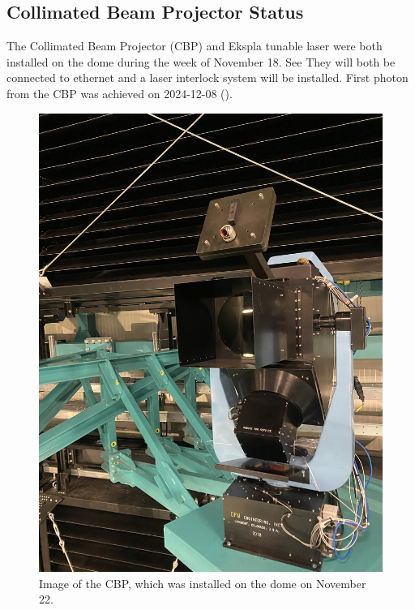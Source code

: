 \subsection{Collimated Beam Projector Status}
\label{sec:cbp}

The Collimated Beam Projector (CBP) and Ekspla tunable laser were both installed on the dome during the week
of November 18. See  They will both be connected to ethernet and a laser interlock system will
be installed. First photon from the CBP was achieved on 2024-12-08 ().

  
\begin{figure}[htbp]
  \begin{center}
    \includegraphics[height=0.5\textheight]{throughput_for_focused_light_figures/cbp_on_dome_2}
  \end{center}
  \caption{Image of the CBP, which was installed on the dome on November 22.}
  \label{fig:cbp_2}
\end{figure}

